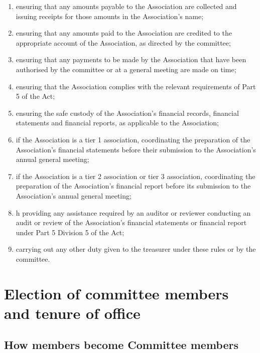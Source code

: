 \documentclass[../constitution.tex]{subfiles}
\begin{document}
\begin{enumerate}
  \item ensuring that any amounts payable to the Association are collected and issuing receipts for those amounts in the Association's name;
  \item ensuring that any amounts paid to the Association are credited to the appropriate account of the Association, as directed by the committee;
  \item ensuring that any payments to be made by the Association that have been authorised by the committee or at a general meeting are made on time;
  \item ensuring that the Association complies with the relevant requirements of Part 5 of the Act;
  \item ensuring the safe custody of the Association's financial records, financial statements and financial reports, as applicable to the Association;
  \item if the Association is a tier 1 association, coordinating the preparation of the Association's financial statements before their submission to the Association's annual general meeting;
  \item if the Association is a tier 2 association or tier 3 association, coordinating the preparation of the Association's financial report before its submission to the Association's annual general meeting;
  \item h providing any assistance required by an auditor or reviewer conducting an audit or review of the Association's financial statements or financial report under Part 5 Division 5 of the Act;

  \item carrying out any other duty given to the treasurer under these rules or by the committee.
\end{enumerate}

\hypertarget{division-3-election-of-committee-members-and-tenure-of-office}{%
  \section{Election of committee members and tenure of office}\label{division-3-election-of-committee-members-and-tenure-of-office}}

\hypertarget{how-members-become-committee-members}{%
  \subsection{How members become Committee members}\label{how-members-become-committee-members}}
\end{document}
